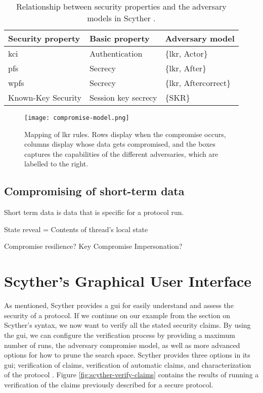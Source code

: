 \begin{table}[h]
\centering
\begin{tabular}{|l|l|l|}
\hline
Security property                   & Basic property           & Adversary model    			\\ \hline
\gls{kci} 							 & Authentication           & \{\gls{lkr}, Actor\}        	\\ \hline
\gls{pfs}      						 & Secrecy                  & \{\gls{lkr}, After\}        \\ \hline
\gls{wpfs} 						     & Secrecy                  & \{\gls{lkr}, Aftercorrect\} \\ \hline
Known-Key Security                  & Session key secrecy 		 & \{SKR\}                		\\ \hline
\end{tabular}
\caption{Relationship between security properties and the adversary models in Scyther \cite{basin2010modeling}.}
\label{tab:sec-prop-adv-mod}
\end{table}


\begin{figure}
	\centering
	\texttt{[image: compromise-model.png]}
	\caption{Mapping of \gls{lkr} rules. Rows display when the compromise occurs, columns display whose data gets compromised, and the boxes captures the capabilities of the different adversaries, which are labelled to the right\cite{basin2010modeling}.}
	\label{fig:compromise-model}
\end{figure}


\subsection{Compromising of short-term data}

Short term data is data that is specific for a protocol run. 

State reveal = Contents of thread's local state



Compromise resilience? Key Compromise Impersonation?	





\section{Scyther's Graphical User Interface}

As mentioned, Scyther provides a \gls{gui} for easily understand and assess the security of a protocol. 
If we continue on our example from the section on Scyther's syntax, we now want to verify all the stated security claims. By using the \gls{gui}, we can configure the verification process by providing a maximum number of runs, the adversary compromise model, as well as more advanced options for how to prune the search space. Scyther provides three options in its \gls{gui}; verification of claims, verification of automatic claims, and characterization of the protocol \cite{cremers2008scyther}. Figure \ref{fig:scyther-verify-claims} contains the results of running a verification of the claims previously described for a secure protocol.


